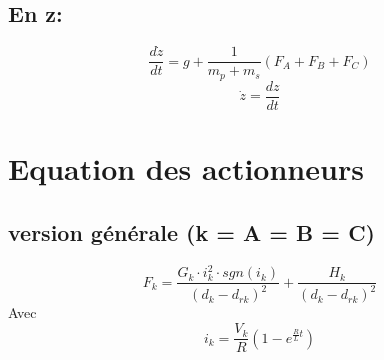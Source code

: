 \documentclass{article}
\begin{document}
\subsection{En z:}
\begin{equation}
    \frac{d\dot z}{dt} = g + \frac{1}{m_p + m_s}(F_A + F_B + F_C)
\end{equation}
\begin{equation}
   \dot z  = \frac{dz}{dt}
\end{equation}

\section{Equation des actionneurs}
\subsection{version générale (k = A = B = C)}

\begin{equation}
   F_k =   \frac{G_k \cdot i_k^2 \cdot sgn(i_k)}{(d_k - d_{rk})^2} + \frac{H_k}{(d_k - d_{rk})^2}
\end{equation}
Avec
\begin{equation}
    i_k =   \frac{V_k}{R}(1-e^{\frac{R}{L}t})
\end{equation}
\end{document}
